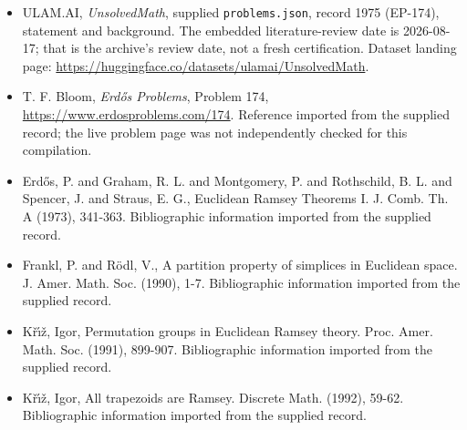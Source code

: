 \documentclass[11pt,a4paper]{article}
\begin{document}
{\small

\begin{itemize}

\item[\hypertarget{source:1975:1}{S1}] ULAM.AI, \emph{UnsolvedMath}, supplied \texttt{problems.json}, record 1975 (EP-174), statement and background. The embedded literature-review date is 2026-08-17; that is the archive’s review date, not a fresh certification. Dataset landing page: \url{https://huggingface.co/datasets/ulamai/UnsolvedMath}.

\item[\hypertarget{source:1975:2}{S2}] T. F. Bloom, \emph{Erdős Problems}, Problem 174, \url{https://www.erdosproblems.com/174}. Reference imported from the supplied record; the live problem page was not independently checked for this compilation.

\item[\hypertarget{source:1975:3}{S3}] Erd\H{o}s, P. and Graham, R. L. and Montgomery, P. and Rothschild, B. L. and Spencer, J. and Straus, E. G., Euclidean Ramsey Theorems I. J. Comb. Th. A (1973), 341-363. Bibliographic information imported from the supplied record.

\item[\hypertarget{source:1975:4}{S4}] Frankl, P. and R\"{o}dl, V., A partition property of simplices in Euclidean space. J. Amer. Math. Soc. (1990), 1-7. Bibliographic information imported from the supplied record.

\item[\hypertarget{source:1975:5}{S5}] K\v{r}\'{\i}\v{z}, Igor, Permutation groups in Euclidean Ramsey theory. Proc. Amer. Math. Soc. (1991), 899-907. Bibliographic information imported from the supplied record.

\item[\hypertarget{source:1975:6}{S6}] K\v{r}\'{\i}\v{z}, Igor, All trapezoids are Ramsey. Discrete Math. (1992), 59-62. Bibliographic information imported from the supplied record.

\end{itemize}

}

\label{end:1975}
\end{document}
